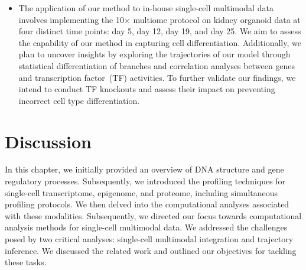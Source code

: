 \begin{itemize}
	\item The application of our method to in-house single-cell multimodal data involves implementing the 10$\times$ multiome protocol on kidney organoid data at four distinct time points: day 5, day 12, day 19, and day 25. We aim to assess the capability of our method in capturing cell differentiation. Additionally, we plan to uncover insights by exploring the trajectories of our model through statistical differentiation of branches and correlation analyses between genes and transcription factor~(TF) activities. To further validate our findings, we intend to conduct TF knockouts and assess their impact on preventing incorrect cell type differentiation.

\end{itemize}


\section{Discussion}
\label{bgTI:discussion}
In this chapter, we initially provided an overview of DNA structure and gene regulatory processes. Subsequently, we introduced the profiling techniques for single-cell transcriptome, epigenome, and proteome, including simultaneous profiling protocols. We then delved into the computational analyses associated with these modalities. Subsequently, we directed our focus towards computational analysis methods for single-cell multimodal data. We addressed the challenges posed by two critical analyses: single-cell multimodal integration and trajectory inference. We discussed the related work and outlined our objectives for tackling these tasks.
